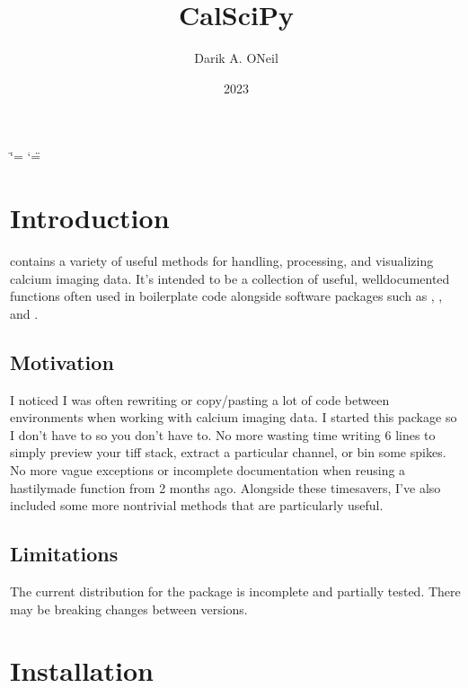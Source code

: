 \documentclass[letterpaper,10pt,english]{sphinxmanual}
\title{CalSciPy}
\date{2023}
\author{Darik A.\@{} O\textquotesingle{}Neil}
\begin{document}
\ifdefined\shorthandoff
  \ifnum\catcode`\=\string=\active\shorthandoff{=}\fi
  \ifnum\catcode`\"=\active{}\fi
\fi

\pagestyle{empty}
\sphinxmaketitle
\pagestyle{plain}
\sphinxtableofcontents
\pagestyle{normal}
\label{\detokenize{index::doc}}


\sphinxstepscope


\chapter{Introduction}
\label{\detokenize{Introduction:introduction}}\label{\detokenize{Introduction::doc}}
\sphinxAtStartPar
{} contains a variety of useful methods for handling, processing, and visualizing calcium imaging data.
It’s intended to be a collection of useful, well\sphinxhyphen{}documented functions often used in boilerplate code alongside software
packages such as , ,
and .


\section{Motivation}
\label{\detokenize{Introduction:motivation}}
\sphinxAtStartPar
I noticed I was often re\sphinxhyphen{}writing or copy/pasting a lot of code between environments when working with calcium imaging
data. I started this package  so I don’t have to  so you don’t have to. No more wasting time writing 6 lines to simply
preview your tiff stack, extract a particular channel, or bin some spikes. No more vague exceptions or incomplete
documentation when re\sphinxhyphen{}using a hastily\sphinxhyphen{}made function from 2 months ago. Alongside these time\sphinxhyphen{}savers, I’ve also included
some more non\sphinxhyphen{}trivial methods that are particularly useful.


\section{Limitations}
\label{\detokenize{Introduction:limitations}}
\sphinxAtStartPar
The current distribution for the package is incomplete and partially tested. There may be breaking changes between versions.

\sphinxstepscope


\chapter{Installation}
\label{\detokenize{Installation:installation}}\label{\detokenize{Installation::doc}}
\end{document}
